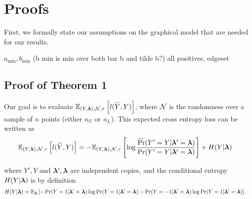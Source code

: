 

\section{Proofs}

First, we formally state our assumptions on the graphical model that are needed for our results.

\begin{assumption}
$a_{\min}, b_{\min}$ (b min is min over both bar b and tilde b?) all positives, edgeset 
\end{assumption}

\subsection{Proof of Theorem 1}

Our goal is to evaluate $\mathbb{E}_{(Y, \bm{\lambda}), \mathcal{N}, \tau}\left[l(\widetilde{Y}, Y)\right]$, where $\mathcal{N}$ is the randomness over a sample of $n$ points (either $n_U$ or $n_L$). This expected cross entropy loss can be written as
\begin{align}
    \mathbb{E}_{(Y, \bm{\lambda}), \mathcal{N}, \tau}\left[l(\widetilde{Y}, Y)\right] &= - \mathbb{E}_{(Y, \bm{\lambda}), \mathcal{N}, \tau}\left[ \log \frac{\widetilde{\Pr}(Y' = Y | \bm{\lambda}' = \bm{\lambda})}{\Pr(Y' = Y | \bm{\lambda}' = \bm{\lambda})}\right] + H(Y | \bm{\lambda}) \label{eq:cross-entropy}
\end{align}

where $Y', Y$ and $\bm{\lambda}', \bm{\lambda}$ are independent copies, and the conditional entropy $H(Y | \bm{\lambda})$ is by definition
\begin{align}
    H(Y | \bm{\lambda}) &= \mathbb{E}_{\bm{\lambda}}\left[- \Pr(Y = 1 | \bm{\lambda}' = \bm{\lambda}) \log \Pr(Y = 1 | \bm{\lambda}' = \bm{\lambda}) - \Pr(Y = -1 | \bm{\lambda}' = \bm{\lambda}) \log \Pr(Y = 1 | \bm{\lambda}' = \bm{\lambda})\right].
\end{align}

